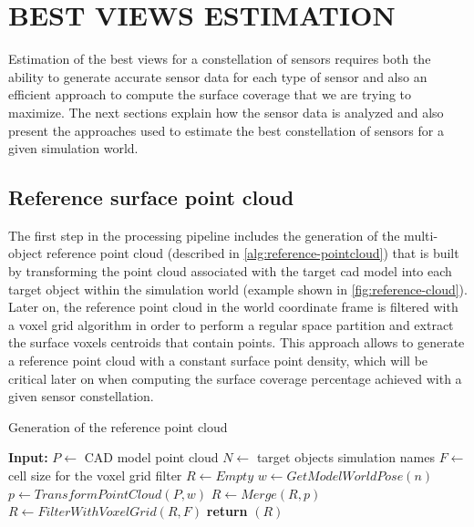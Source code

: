 \section{\uppercase{Best views estimation}}\label{sec:best-views-estimation}

\noindent Estimation of the best views for a constellation of sensors requires both the ability to generate accurate sensor data for each type of sensor and also an efficient approach to compute the surface coverage that we are trying to maximize. The next sections explain how the sensor data is analyzed and also present the approaches used to estimate the best constellation of sensors for a given simulation world.

\subsection{Reference surface point cloud}

The first step in the processing pipeline includes the generation of the multi-object reference point cloud (described in \cref{alg:reference-pointcloud}) that is built by transforming the point cloud associated with the target \gls{cad} model into each target object within the simulation world (example shown in \cref{fig:reference-cloud}). Later on, the reference point cloud in the world coordinate frame is filtered with a voxel grid algorithm in order to perform a regular space partition and extract the surface voxels centroids that contain points. This approach allows to generate a reference point cloud with a constant surface point density, which will be critical later on when computing the surface coverage percentage achieved with a given sensor constellation.

\begin{algorithm}
	\caption{Generation of the reference point cloud}
	\label{alg:reference-pointcloud}
	\begin{algorithmic}[1]
		\State \textbf{Input:}
		\State $P \gets$ CAD model point cloud
		\State $N \gets$ target objects simulation names
		\State $F \gets$ cell size for the voxel grid filter
			\State $R \gets Empty$
				\State $w \gets GetModelWorldPose(n)$
				\State $p \gets TransformPointCloud(P,w)$
				\State $R \gets Merge(R,p)$
			\EndFor
			\State $R \gets FilterWithVoxelGrid(R,F)$
			\State \textbf{return} $(R)$
		\EndProcedure
	\end{algorithmic}
\end{algorithm}

